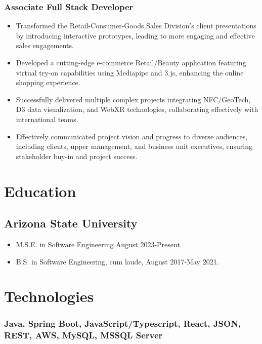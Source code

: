 \documentclass{article}
\begin{document}
	\subsubsection{Associate Full Stack Developer}
	\begin{itemize}
		\item Transformed the Retail-Consumer-Goods Sales Division's client presentations by introducing interactive prototypes, leading to more engaging and effective sales engagements.
		\item Developed a cutting-edge e-commerce Retail/Beauty application featuring virtual try-on capabilities using Mediapipe and 3.js, enhancing the online shopping experience.
		\item Successfully delivered multiple complex projects integrating NFC/GeoTech, D3 data visualization, and WebXR technologies, collaborating effectively with international teams.
		\item Effectively communicated project vision and progress to diverse audiences, including clients, upper management, and business unit executives, ensuring stakeholder buy-in and project success.
	\end{itemize}

\section{Education}
	\subsection{Arizona State University}
		\begin{itemize}
			\item M.S.E. in Software Engineering August 2023-Present.
			\item B.S. in Software Engineering, cum laude, August 2017-May 2021.
		\end{itemize}

\section{Technologies}
	\subsubsection{Java, Spring Boot, JavaScript/Typescript, React, JSON, REST, AWS, MySQL, MSSQL Server}
\end{document}
